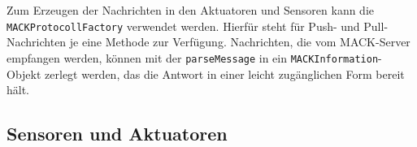Zum Erzeugen der Nachrichten in den Aktuatoren und Sensoren kann die \texttt{MACKProtocollFactory} verwendet werden. Hierfür steht für Push- und Pull-Nachrichten je eine Methode zur Verfügung. Nachrichten, die vom MACK-Server empfangen werden, können mit der \texttt{parseMessage} in ein \texttt{MACKInformation}-Objekt zerlegt werden, das die Antwort in einer leicht zugänglichen Form bereit hält.

\subsection{Sensoren und Aktuatoren}\label{subsec:real_sensors}




%
%
%
%

